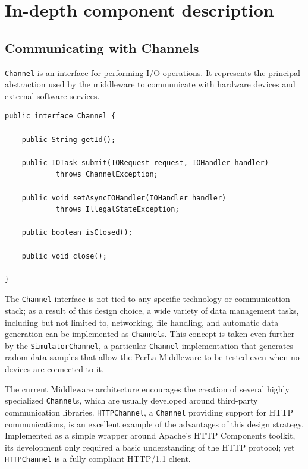 \chapter{In-depth component description}
\label{cha:components}

\section{Communicating with Channels}
\label{sec:channel}

\texttt{Channel} is an interface for performing I/O operations. It represents
the principal abstraction used by the middleware to communicate with hardware
devices and external software services.

\lstset{language=Java}
\begin{lstlisting}[float,caption=The Channel interface,label={lst:channel}]
public interface Channel {

	public String getId();
	
	public IOTask submit(IORequest request, IOHandler handler)
			throws ChannelException;
	
	public void setAsyncIOHandler(IOHandler handler)
			throws IllegalStateException;
			
	public boolean isClosed();
	
	public void close();
			
}
\end{lstlisting}

The \texttt{Channel} interface is not tied to any specific technology or
communication stack; as a result of this design choice, a wide variety of data
management tasks, including but not limited to, networking, file handling, and
automatic data generation can be implemented as \texttt{Channel}s. This concept
is taken even further by the \texttt{SimulatorChannel}, a particular
\texttt{Channel} implementation that generates radom data samples that allow
the PerLa Middleware to be tested even when no devices are connected to it.

The current Middleware architecture encourages the creation of several highly
specialized \texttt{Channel}s, which are usually developed around third-party
communication libraries. \texttt{HTTPChannel}, a \texttt{Channel} providing
support for HTTP communications, is an excellent example of the advantages of
this design strategy. Implemented as a simple wrapper around Apache's HTTP
Components toolkit, its development only required a basic understanding of the
HTTP protocol; yet \texttt{HTTPChannel} is a fully compliant HTTP/1.1 client.

